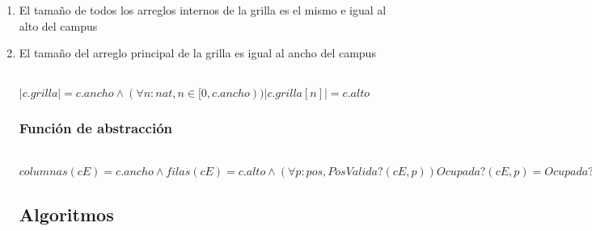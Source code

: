 \begin{enumerate}
  \item  El tamaño de todos los arreglos internos de la grilla es el mismo e igual al alto del campus
  \item El tamaño del arreglo principal de la grilla es igual al ancho del campus
  

  \\
 $|c.grilla|=c.ancho \land (\forall n:nat, n \in \lbrack 0, c.ancho)) |c.grilla [n]|=c.alto$




\subsubsection*{Funci\'on de abstracción}

 \\
$columnas(cE)=c.ancho \land filas(cE)=c.alto\land (\forall p:pos, PosValida?(cE,p)) Ocupada?(cE,p)=Ocupada?(c,p)$

\newpage

\subsection{Algoritmos}

\end{enumerate}
